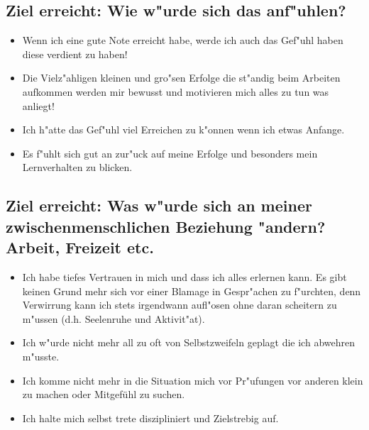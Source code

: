 \documentclass[11pt,a4paper,german]{article}
\begin{document}
\subsection{Ziel erreicht: Wie w"urde sich das anf"uhlen?}
\begin{itemize}
	\item Wenn ich eine gute Note erreicht habe, werde ich auch das Gef"uhl haben diese verdient zu haben! 
	\item Die Vielz"ahligen kleinen und gro"sen Erfolge die st"andig beim Arbeiten aufkommen werden mir bewusst und motivieren mich alles zu tun was anliegt!
	\item Ich h"atte das Gef"uhl viel Erreichen zu k"onnen wenn ich etwas Anfange.
	\item Es f"uhlt sich gut an zur"uck auf meine Erfolge und besonders mein Lernverhalten zu blicken.
\end{itemize}

\subsection{Ziel erreicht: Was w"urde sich an meiner zwischenmenschlichen Beziehung "andern? Arbeit, Freizeit etc.}
\begin{itemize}
	\item Ich habe tiefes Vertrauen in mich und dass ich alles erlernen kann. Es gibt keinen Grund mehr sich vor einer Blamage in Gespr"achen zu f"urchten, denn Verwirrung kann ich stets irgendwann aufl"osen ohne daran scheitern zu m"ussen (d.h. Seelenruhe und Aktivit"at).
	\item Ich w"urde nicht mehr all zu oft von Selbstzweifeln geplagt die ich abwehren m"usste.
	\item Ich komme nicht mehr in die Situation mich vor Pr"ufungen vor anderen klein zu machen oder Mitgefühl zu suchen.
	\item Ich halte mich selbst trete diszipliniert und Zielstrebig auf.
\end{itemize}
\end{document}
